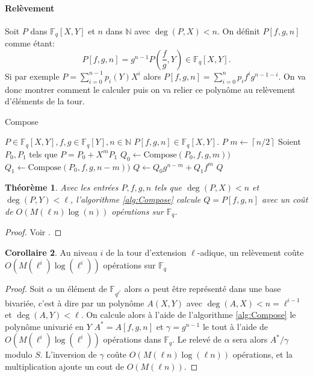 \documentclass[10pt,a4paper]{book}
\theoremstyle{plain}
\newtheorem{thm}{Théorème}
\theoremstyle{definition}
\theoremstyle{definition}
\newtheorem{cor}[thm]{Corollaire}
\theoremstyle{definition}
\theoremstyle{definition}
\theoremstyle{remark}
\theoremstyle{remark}
\begin{document}
\paragraph{Relèvement}
Soit $P$ dans $\mathbb{F}_q[X,Y]$ et $n$ dans $\mathbb{N}$ avec $\deg(P,X)<n$. On définit $P[f,g,n]$ comme étant:
\[
P[f,g,n]=g^{n-1}P(\frac{f}{g},Y)\in \mathbb{F}_q[X,Y].
\]
Si par exemple $P=\sum_{i=0}^{n-1}p_i(Y)X^i$ alors $P[f,g,n]=\sum_{i=0}^{n}p_if^ig^{n-1-i}$. On va donc montrer comment le calculer puis on va relier ce polynôme au relèvement d'éléments de la tour.

\begin{algorithm}
\caption{\label{alg:Compose}Compose}
\begin{algorithmic}[1]
\REQUIRE $P \in \mathbb{F}_q[X,Y], f,g \in \mathbb{F}_q[Y], n \in \mathbb{N}$
\ENSURE $P[f,g,n] \in \mathbb{F}_q[X,Y]$.
 \RETURN $P$
\ELSE
\STATE $m \gets \left\lceil n/2 \right\rceil   $
\STATE Soient $P_0,P_1$ tels que $P=P_0 + X^{m} P_1$
\STATE $Q_0 \gets \textrm{Compose}(P_0,f,g,m))$
\STATE $Q_1 \gets \textrm{Compose}(P_0,f,g,n-m))$
\STATE $Q \gets Q_0g^{n-m}+Q_1f^m$
\RETURN $Q$ 
\ENDIF
\end{algorithmic}
\end{algorithm}


\begin{thm}\label{thm:compose}
Avec les entrées $P,f,g,n$ tels que $\deg(P,X)<n$ et $\deg(P,Y)<\ell$, l'algorithme \ref{alg:Compose} calcule $Q=P[f,g,n]$ avec un coût de $O(M(\ell n)\log(n))$ opérations sur $\mathbb{F}_q$.
\end{thm}

\begin{proof}
Voir \cite{DeFeo-Doliskani-Schost13}.
\end{proof}

\begin{cor}
Au niveau $i$ de la tour d'extension $\ell$-adique, un relèvement coûte $O(M(\ell^i)\log(\ell^i))$ opérations sur $\mathbb{F}_q$
\end{cor}

\begin{proof}
Soit $\alpha$ un élément de $\mathbb{F}_{q^{\ell^i}}$ alors $\alpha$ peut être représenté dans une base bivariée, c'est à dire par un polynôme $A(X,Y)$ avec $\deg(A,X)<n=\ell^{i-1}$ et $\deg(A,Y)<\ell$. On calcule alors à l'aide de l'algorithme \ref{alg:Compose} le polynôme univarié en $Y$ $A^*=A[f,g,n]$ et $\gamma = g^{n-1}$ le tout à l'aide de $O(M(\ell^i)\log(\ell^i))$ opérations dans $\mathbb{F}_q$. Le relevé de $\alpha$ sera alors $A^*/\gamma$ modulo $S$. L'inversion de $\gamma$ coûte $O(M(\ell n)\log(\ell n))$ opérations, et la multiplication ajoute un cout de $O(M(\ell n))$.
\end{proof}
\end{document}
